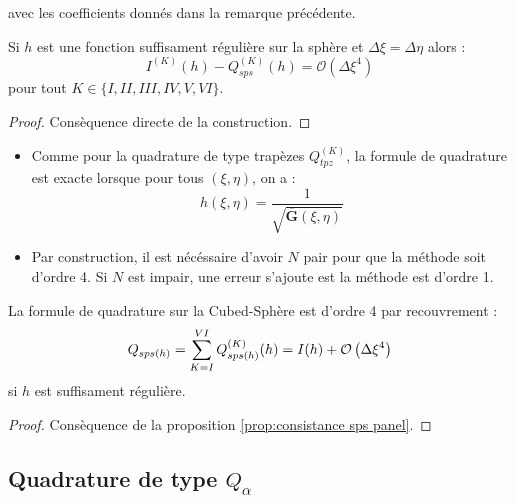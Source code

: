 avec les coefficients donnés dans la remarque précédente.

\begin{proposition}
Si $h$ est une fonction suffisament régulière sur la sphère et $\Delta \xi = \Delta \eta$ alors :
\begin{equation}
I^{(K)}(h) - Q^{(K)}_{sps}(h) = \mathcal{O} \left( \Delta \xi^4 \right)
\end{equation}
pour tout $K \in \lbrace I, II, III, IV, V, VI \rbrace$.
\label{prop:consistance sps panel}
\end{proposition}

\begin{proof}
Consèquence directe de la construction.
\end{proof}

\begin{remarque}
\begin{itemize}
\item Comme pour la quadrature de type trapèzes $Q_{tpz}^{(K)}$, la formule de quadrature est exacte lorsque pour tous $(\xi,\eta)$, on a :
\begin{equation}
h(\xi,\eta)=\dfrac{1}{\sqrt{\overline{\mathbf{G}}(\xi,\eta)}}
\end{equation}
\item Par construction, il est nécéssaire d'avoir $N$ pair pour que la méthode soit d'ordre 4. Si $N$ est impair, une erreur s'ajoute est la méthode est d'ordre 1.
\end{itemize}
\end{remarque}

\begin{proposition}
La formule de quadrature sur la Cubed-Sphère est d'ordre 4 par recouvrement :
\begin{equation}
Q_{sps(h)}=\displaystyle\sum\limits_{K=I}^{VI} Q_{sps(h)}^{(K)}(h) = I(h) + \mathcal{O} \left( \Delta \xi^4 \right)
\end{equation}
si $h$ est suffisament régulière.
\end{proposition}

\begin{proof}
Consèquence de la proposition \ref{prop:consistance sps panel}.
\end{proof}




\subsection{Quadrature de type \texorpdfstring{$Q_{\alpha}$}{a}}

